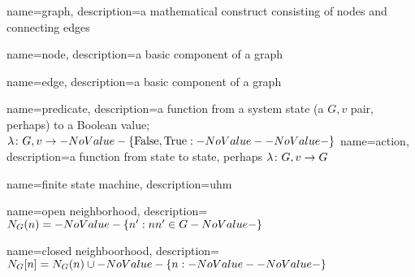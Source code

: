 
{
  name=graph,
  description={a mathematical construct consisting of nodes and connecting edges}
}

{
  name=node,
  description={a basic component of a graph}
}

{
  name=edge,
  description={a basic component of a graph}
}

{
  name=predicate,
  description={a function from a system state (a $G, v$ pair, perhaps) to a Boolean value; $\Function{G, v}{\Set{\text{False}, \text{True}}}$}
}
{
  name=action,
  description={a function from state to state, perhaps $\Function{G, v}{G}$}
}

{
  name=finite state machine,
  description={uhm}
}

{
  name=open neighborhood,
  description={$\OpenNeighborhood{n}[G] = \Set{n^\prime}[nn^\prime \in G]$}
}

{
  name=closed neighboorhood,
  description={$\ClosedNeighborhood{n}[G] = \OpenNeighborhood{n}[G] \cup \Set{n}$}
}

